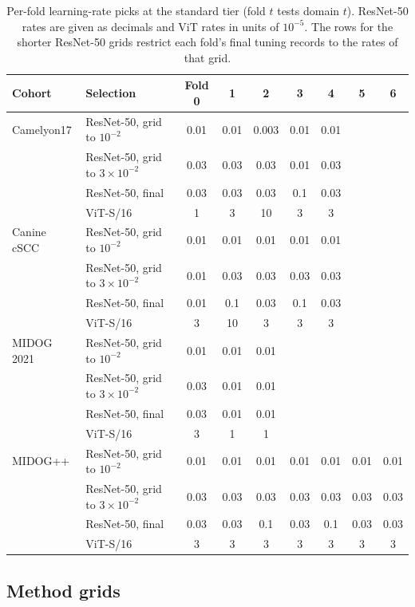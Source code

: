 \begin{table}[width=\linewidth,pos=t]
\caption{Per-fold learning-rate picks at the standard tier (fold $t$ tests
domain $t$). ResNet-50 rates are given as decimals and ViT rates in units of
$10^{-5}$. The rows for the shorter ResNet-50 grids restrict each fold's
final tuning records to the rates of that grid.}
\label{tab:tuning-lr-folds}
\footnotesize
\begin{tabular*}{\tblwidth}{@{\extracolsep{\fill}}llccccccc@{}}
\toprule
Cohort & Selection & Fold 0 & 1 & 2 & 3 & 4 & 5 & 6 \\
\midrule
Camelyon17 & ResNet-50, grid to $10^{-2}$ & 0.01 & 0.01 & 0.003 & 0.01 & 0.01 & & \\
 & ResNet-50, grid to $3{\times}10^{-2}$ & 0.03 & 0.03 & 0.03 & 0.01 & 0.03 & & \\
 & ResNet-50, final & 0.03 & 0.03 & 0.03 & 0.1 & 0.03 & & \\
 & ViT-S/16 & 1 & 3 & 10 & 3 & 3 & & \\
\addlinespace
Canine cSCC & ResNet-50, grid to $10^{-2}$ & 0.01 & 0.01 & 0.01 & 0.01 & 0.01 & & \\
 & ResNet-50, grid to $3{\times}10^{-2}$ & 0.01 & 0.03 & 0.03 & 0.03 & 0.03 & & \\
 & ResNet-50, final & 0.01 & 0.1 & 0.03 & 0.1 & 0.03 & & \\
 & ViT-S/16 & 3 & 10 & 3 & 3 & 3 & & \\
\addlinespace
MIDOG 2021 & ResNet-50, grid to $10^{-2}$ & 0.01 & 0.01 & 0.01 & & & & \\
 & ResNet-50, grid to $3{\times}10^{-2}$ & 0.03 & 0.01 & 0.01 & & & & \\
 & ResNet-50, final & 0.03 & 0.01 & 0.01 & & & & \\
 & ViT-S/16 & 3 & 1 & 1 & & & & \\
\addlinespace
MIDOG++ & ResNet-50, grid to $10^{-2}$ & 0.01 & 0.01 & 0.01 & 0.01 & 0.01 & 0.01 & 0.01 \\
 & ResNet-50, grid to $3{\times}10^{-2}$ & 0.03 & 0.03 & 0.03 & 0.03 & 0.03 & 0.03 & 0.03 \\
 & ResNet-50, final & 0.03 & 0.03 & 0.1 & 0.03 & 0.1 & 0.03 & 0.03 \\
 & ViT-S/16 & 3 & 3 & 3 & 3 & 3 & 3 & 3 \\
\bottomrule
\end{tabular*}
\end{table}

\subsection{Method grids}
\label{app:tuning-grids}

